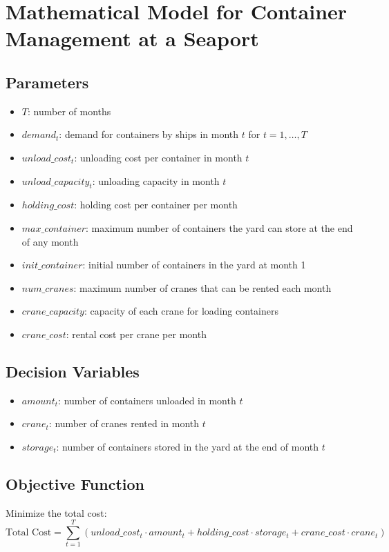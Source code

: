 \documentclass{article}
\begin{document}
\section*{Mathematical Model for Container Management at a Seaport}

\subsection*{Parameters}
\begin{itemize}
    \item $T$: number of months
    \item $demand_{t}$: demand for containers by ships in month $t$ for $t = 1, \ldots, T$
    \item $unload\_cost_{t}$: unloading cost per container in month $t$
    \item $unload\_capacity_{t}$: unloading capacity in month $t$
    \item $holding\_cost$: holding cost per container per month
    \item $max\_container$: maximum number of containers the yard can store at the end of any month
    \item $init\_container$: initial number of containers in the yard at month 1
    \item $num\_cranes$: maximum number of cranes that can be rented each month
    \item $crane\_capacity$: capacity of each crane for loading containers
    \item $crane\_cost$: rental cost per crane per month
\end{itemize}

\subsection*{Decision Variables}
\begin{itemize}
    \item $amount_{t}$: number of containers unloaded in month $t$
    \item $crane_{t}$: number of cranes rented in month $t$
    \item $storage_{t}$: number of containers stored in the yard at the end of month $t$
\end{itemize}

\subsection*{Objective Function}
Minimize the total cost:
\[
\text{Total Cost} = \sum_{t=1}^{T} \left( unload\_cost_{t} \cdot amount_{t} + holding\_cost \cdot storage_{t} + crane\_cost \cdot crane_{t} \right)
\]
\end{document}
